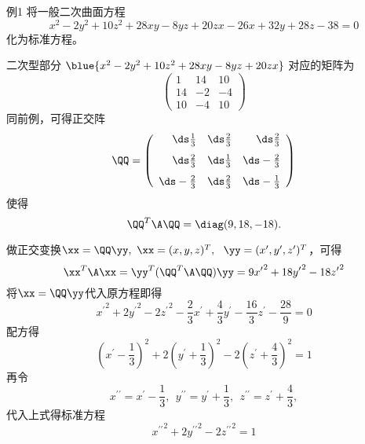 \begin{frame}
  \begin{footnotesize}
    \begin{exampleblock}{例1}
      将一般二次曲面方程
      $$
      x^2-2y^2+10z^2+28xy-8yz+20zx-26x+32y+28z-38=0
      $$
      化为标准方程。
    \end{exampleblock}
    \pause
    \jiename
    二次型部分
    $
    \blue{x^2-2y^2+10z^2+28xy-8yz+20zx}
    $
    对应的矩阵为
    $$
    \left(
    \begin{array}{rrr}
      1&14&10\\
      14&-2&-4\\
      10&-4&10
    \end{array}
    \right)
    $$
    同前例，可得正交阵
    $$
    \QQ=\left(
    \begin{array}{rrr}
      \ds\frac13&\ds\frac23&\ds\frac23\\[0.1in]
      \ds\frac23&\ds\frac13&\ds-\frac23\\[0.1in]
      \ds-\frac23&\ds\frac23&\ds-\frac13
    \end{array}
    \right)
    $$
    使得
    $$
    \QQ^T\A\QQ=\diag(9,18,-18).
    $$
  \end{footnotesize}
\end{frame}

\begin{frame}
  \begin{footnotesize}
    做正交变换$\xx=\QQ\yy,~\xx=(x,y,z)^T,~~\yy=(x^\prime,y^\prime,z^\prime)^T$，可得
    $$
    \xx^T\A\xx=\yy^T(\QQ^T\A\QQ)\yy=9{x^\prime}^2+18{y^\prime}^2-18{z^\prime}^2
    $$\pause
    将$\xx=\QQ\yy$代入原方程即得
    $$
    {x^\prime}^2+2{y^\prime}^2-2{z^\prime}^2-\frac23x^\prime+\frac43y^\prime-\frac{16}3z^\prime-\frac{28}9=0
    $$\pause
    配方得
    $$
    \left(x^\prime-\frac13\right)^2+2\left(y^\prime+\frac13\right)^2-2\left(z^\prime+\frac43\right)^2=1
    $$\pause
    再令
    $$
    x^{\prime\prime}=x^\prime-\frac13,~~
    y^{\prime\prime}=y^\prime+\frac13,~~
    z^{\prime\prime}=z^\prime+\frac43,
    $$
    代入上式得标准方程
    $$
    {x^{\prime\prime}}^2+2{y^{\prime\prime}}^2-2{z^{\prime\prime}}^2=1
    $$
  \end{footnotesize}
\end{frame}
